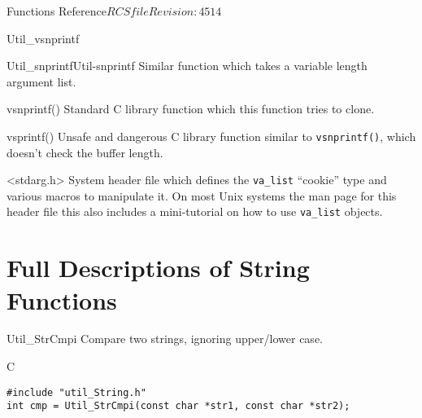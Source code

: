 \begin{cactuspart}{ Functions Reference}{$RCSfile$}{$Revision: 4514 $}
\begin{FunctionDescription}{Util\_vsnprintf}
\begin{SeeAlsoSection}
\begin{SeeAlso2}{Util\_snprintf}{Util-snprintf}
Similar function which takes a variable length argument list.
\end{SeeAlso2}
\begin{SeeAlso}{vsnprintf()}
Standard C library function which this function tries to clone.
\end{SeeAlso}
\begin{SeeAlso}{vsprintf()}
Unsafe and dangerous C library function similar to \verb|vsnprintf()|,
which doesn't check the buffer length.
\end{SeeAlso}
\begin{SeeAlso}{<stdarg.h>}
System header file which defines the \verb|va_list| ``cookie'' type
and various macros to manipulate it.  On most Unix systems the man
page for this header file this also includes a mini-tutorial on how
to use \verb|va_list| objects.
\end{SeeAlso}
\end{SeeAlsoSection}
\end{FunctionDescription}


\chapter{Full Descriptions of String Functions}


\begin{FunctionDescription}{Util\_StrCmpi}
\label{Util-StrCmpi}
Compare two strings, ignoring upper/lower case.

\begin{SynopsisSection}
\begin{Synopsis}{C}
\begin{verbatim}
#include "util_String.h"
int cmp = Util_StrCmpi(const char *str1, const char *str2);
\end{verbatim}
\end{Synopsis}
\end{SynopsisSection}


\end{FunctionDescription}
\end{cactuspart}

